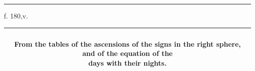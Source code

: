 \documentclass[11pt]{article}
\renewcommand{\arraystretch}{1.18}
\begin{document}
\par\vspace{-1mm}\noindent\rule{\textwidth}{.4pt}\par\vspace{1mm}
\begin{center}{\small f. 180,v.}\end{center}\vspace{-3mm}
\begin{center}\setlength{\tabcolsep}{3pt}\renewcommand{\arraystretch}{1.02}\begin{tabular}{||c|>{\centering\arraybackslash}p{27mm}|>{\centering\arraybackslash}p{25mm}||>{\centering\arraybackslash}p{27mm}|>{\centering\arraybackslash}p{25mm}||>{\centering\arraybackslash}p{27mm}|>{\centering\arraybackslash}p{25mm}||}\hline
\multicolumn{7}{||c||}{\parbox{170mm}{\centering{}\\\textbf{From the tables of the ascensions of the signs in the right sphere, and of the equation of the}\\\textbf{days with their nights.}\vspace{1mm}}} \\ \hline

\end{tabular}
\end{center}
\end{document}
